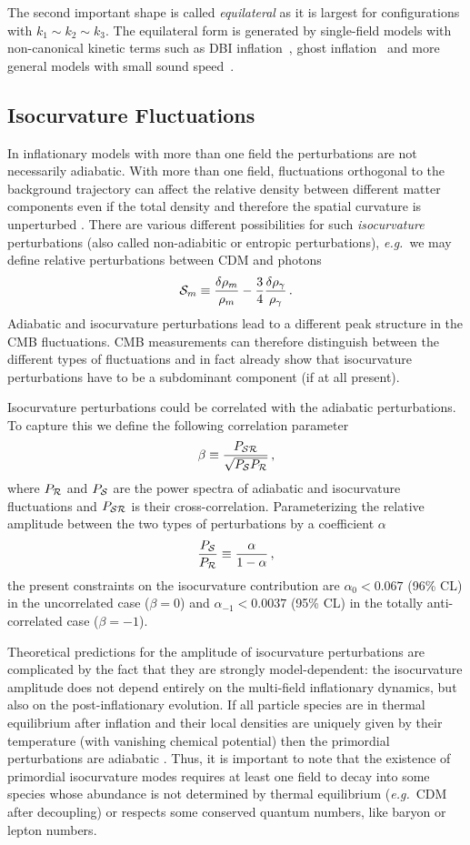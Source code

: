 \documentclass[12pt,letterpaper,rotate]{article}
\def\beq{\begin{equation}}
\def\eeq{\end{equation}}
\def\R{{\cal R}}
\begin{document}
{The second important shape is called {\em equilateral} as it is largest for configurations with $k_1 \sim k_2
\sim k_3$. The equilateral form is generated by single-field models with non-canonical kinetic terms such as DBI
inflation~\cite{Alishahiha:2004eh}, ghost inflation~\cite{GhostInflation,Senatore:2004rj} and more general models
with small sound speed~\cite{Creminelli:2003iq, Chen:2006nt}. 

\subsection{Isocurvature Fluctuations}
\label{sec:iso}

In inflationary models with more than one field the perturbations are not necessarily adiabatic.
With more than one field, fluctuations orthogonal to the background trajectory can affect the relative density between different matter components even if the total density and therefore the spatial curvature is unperturbed \cite{Gordon:2000hv}. 
There are various different possibilities for such {\it isocurvature} perturbations (also called non-adiabitic or entropic perturbations), {\it e.g.}~we may define relative perturbations between CDM and photons
\beq
{\cal S}_m \equiv \frac{\delta \rho_m}{\rho_m} - \frac{3}{4} \frac{\delta \rho_\gamma}{\rho_\gamma}\, .
\eeq
Adiabatic and isocurvature perturbations lead to a different peak structure in the CMB fluctuations.
CMB measurements can therefore distinguish between the different types of fluctuations and in fact already show that isocurvature perturbations have to be a subdominant component (if at all present).

Isocurvature perturbations could be correlated with the adiabatic perturbations. To capture this we define the following correlation parameter
\beq
\beta \equiv \frac{P_{{\cal S} {\cal R}}}{\sqrt{P_{\cal S} P_\R}}\, ,
\eeq
where $P_{\cal R}$ and $P_{\cal S}$ are the power spectra of adiabatic and isocurvature fluctuations and $P_{{\cal S} \R}$ is their cross-correlation.
Parameterizing the relative amplitude between the two types of perturbations by a coefficient $\alpha$
\beq
\frac{P_{\cal S}}{P_\R} \equiv \frac{\alpha}{1-\alpha}\, ,
\eeq
the present constraints on the isocurvature contribution are $\alpha_0 < 0.067$ (96\% CL) in the uncorrelated case ($\beta =0$) and $\alpha_{-1} < 0.0037$ (95\% CL) in the totally anti-correlated case ($\beta = -1$).

Theoretical predictions for the amplitude of 
isocurvature perturbations are complicated by the fact that they are strongly model-dependent: the isocurvature amplitude does not depend entirely on
the multi-field inflationary dynamics, but also on the
post-inflationary evolution. If all particle species are in thermal
equilibrium after inflation and their local densities are uniquely
given by their temperature (with vanishing chemical potential)
then the primordial perturbations are adiabatic
\cite{Lyth:2002my,Weinberg04b}.  Thus, it is important to note that the existence of primordial
isocurvature modes requires at least one field to decay into
some species whose abundance is not determined by thermal equilibrium
({\it e.g.}~CDM after decoupling) or respects some conserved quantum
numbers, like baryon or lepton numbers.

}
\end{document}
